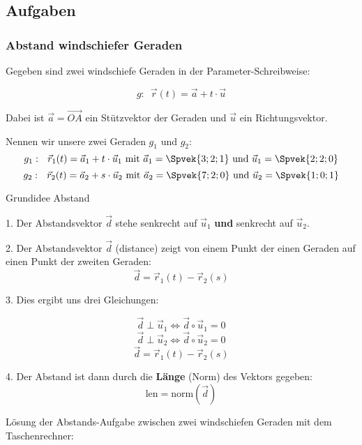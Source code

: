 \newpage
\subsection*{Aufgaben}
\newpage


\subsubsection{Abstand windschiefer Geraden}

Gegeben sind zwei windschiefe Geraden in der Parameter-Schreibweise:

$$g:\,\,\,  \vec{r}(t) = \vec{a}+t\cdot{}\vec{u}$$

Dabei ist $\vec{a} = \overrightarrow{OA}$ ein Stützvektor der Geraden
und $\vec{u}$ ein Richtungsvektor.

Nennen wir unsere zwei Geraden $g_1$ und $g_2$:
$$g_1:\,\,\,\, \vec{r}_1(t) =  \vec{a}_1+t\cdot{}\vec{u}_1 \text{ mit } \vec{a}_1 = \Spvek{3;2;1} \text{ und } \vec{u}_1= \Spvek{2;2;0}$$
$$g_2:\,\,\,\,  \vec{r}_2(t) = \vec{a}_2+s\cdot{}\vec{u}_2 \text{ mit } \vec{a}_2 = \Spvek{7;2;0} \text{ und } \vec{u}_2= \Spvek{1;0;1}$$

\begin{rezept}{Grundidee Abstand}{}

  1. Der Abstandsvektor $\vec{d}$ stehe senkrecht auf $\vec{u}_1$
  \textbf{und} senkrecht auf $\vec{u}_2$.

  2. Der Abstandsvektor $\vec{d}$ (distance) zeigt von einem Punkt der einen Geraden auf
  einen Punkt der zweiten Geraden: $$\vec{d}=\vec{r}_1(t) - \vec{r}_2(s)$$

  3. Dies ergibt uns drei Gleichungen:

  $$\vec{d}\perp\vec{u}_1 \Longleftrightarrow{}  \vec{d}\circ{}\vec{u}_1 = 0$$
  $$\vec{d}\perp\vec{u}_2 \Longleftrightarrow{}  \vec{d}\circ{}\vec{u}_2 = 0$$
  $$\vec{d}=\vec{r}_1(t)-\vec{r}_2(s)$$

  4. Der Abstand ist dann durch die \textbf{Länge} (Norm) des Vektors gegeben:
  $$\text{len} = \text{norm}(\vec{d})$$
  
\end{rezept}
\newpage


Lösung der Abstands-Aufgabe zwischen zwei windschiefen Geraden mit dem
Taschenrechner:
\TRAINER{}


